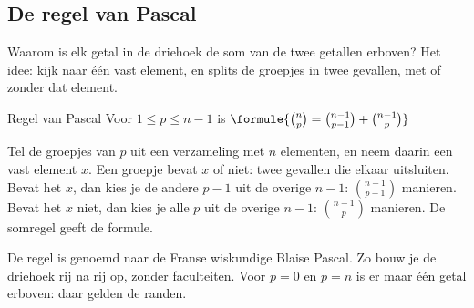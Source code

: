 \begin{oefeningen}
\end{oefeningen}

\subsection{De regel van Pascal}

Waarom is elk getal in de driehoek de som van de twee getallen erboven? Het idee: kijk naar één vast element, en splits de groepjes in twee gevallen, met of zonder dat element.

\begin{theorie}
\begin{stelling}{Regel van Pascal}
Voor $1 \leqslant p \leqslant n - 1$ is \quad $\formule{\binom{n}{p} = \binom{n - 1}{p - 1} + \binom{n - 1}{p}}$
\end{stelling}

\begin{bewijs}
Tel de groepjes van $p$ uit een verzameling met $n$ elementen, en neem daarin een vast element $x$. Een groepje bevat $x$ of niet: twee gevallen die elkaar uitsluiten. Bevat het $x$, dan kies je de andere $p - 1$ uit de overige $n - 1$: $\binom{n - 1}{p - 1}$ manieren. Bevat het $x$ niet, dan kies je alle $p$ uit de overige $n - 1$: $\binom{n - 1}{p}$ manieren. De somregel geeft de formule.
\end{bewijs}
\end{theorie}

De regel is genoemd naar de Franse wiskundige Blaise Pascal. Zo bouw je de driehoek rij na rij op, zonder faculteiten. Voor $p = 0$ en $p = n$ is er maar één getal erboven: daar gelden de randen.


\begin{oefeningen}

\end{oefeningen}

